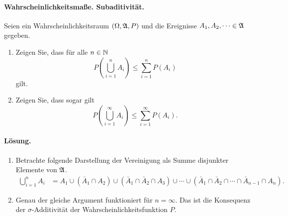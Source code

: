\paragraph{Wahrscheinlichkeitsmaße. Subaditivität.} Seien ein
Wahrscheinlichkeitsraum $(\Omega, \mathfrak A, P)$ und die Ereignisse $A_1, A_2, \cdots
\in \mathfrak A$ gegeben. 
\begin{enumerate}
    \item Zeigen Sie, dass für alle  $n\in \mathbb N$ 
        \begin{equation*}
            P \left(  \bigcup \limits_{i=1}^n A_i \right) \leq \sum_{i=1}^{n} P\left( A_i \right)
        \end{equation*}
        gilt. 

    \item Zeigen Sie, dass sogar gilt 
        \begin{equation*}
            P \left(  \bigcup \limits_{i=1}^\infty A_i \right) \leq \sum_{i=1}^{\infty} P\left( A_i \right).
        \end{equation*}
\end{enumerate}

\paragraph*{Lösung.}
\begin{enumerate}
    \item Betrachte folgende Darstellung der Vereinigung als Summe disjunkter
        Elemente von $\mathfrak A$.
        \begin{align*}
            \bigcup_{i=1}^n A_i &= A_1 \cup (\bar A_1 \cap A_2) \cup 
            (\bar A_1 \cap \bar A_2 \cap A_3) \cup \cdots \cup
            (\bar A_1 \cap \bar A_2 \cap \cdots \cap \bar A_{n-1} \cap A_n).
        \end{align*}

    \item Genau der gleiche Argument funktioniert für $n=\infty$. Das ist 
        die Konsequenz der $\sigma$-Additivität der Wahrscheinlichkeitsfunktion $P$. 
\end{enumerate}


